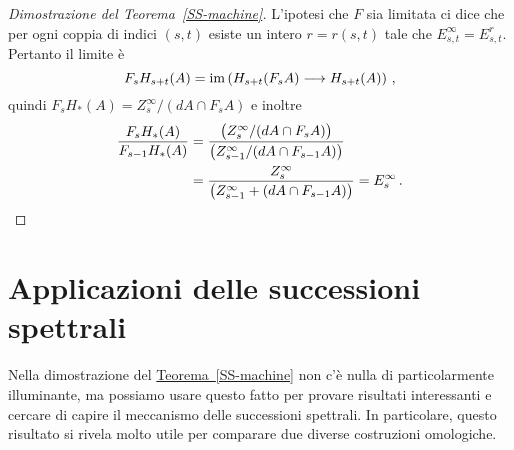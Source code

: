 \begin{proof}[Dimostrazione del Teorema~\ref{SS-machine}]
		L'ipotesi che $F$ sia limitata ci dice che per ogni coppia di indici $(s,t)$
		esiste un intero $r = r(s,t)$ tale che $E^{\infty}_{s,t} = E^{r}_{s,t}$.
		Pertanto il limite è
		\begin{equation*}
			F_{s}H_{s+t}(A) = 
			\operatorname{im} \left( H_{s+t}(F_{s}A) \longrightarrow H_{s+t}(A) \right) \,,
		\end{equation*}
		quindi $F_{s}H_{*}(A) = Z^{\infty}_{s}/(dA \cap F_{s}A)$ e inoltre
		\begin{align*}
			\frac{F_{s}H_{*}(A)}{F_{s-1}H_{*}(A)}
			&= \frac{\big(Z_{s}^{\infty}/(dA \cap F_{s}A) \big)}{\big(Z_{s-1}^{\infty}/(dA \cap F_{s-1}A) \big)} \\
			&= \frac{Z_{s}^{\infty}}{\big(Z_{s-1}^{\infty} + (dA \cap F_{s-1}A) \big)} 
			= E^{\infty}_{s}\,. \qedhere
		\end{align*}
\end{proof}


\section{Applicazioni delle successioni spettrali}

Nella dimostrazione del \hyperref[SS-machine]{Teorema~\ref{SS-machine}}
non c'è nulla di particolarmente illuminante,
ma possiamo usare questo fatto per provare risultati interessanti
e cercare di capire il meccanismo delle successioni spettrali.
In particolare, questo risultato si rivela molto utile 
per comparare due diverse costruzioni omologiche.

